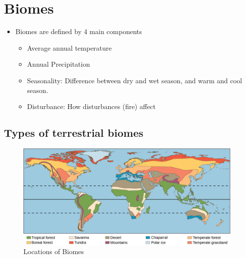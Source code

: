 \documentclass[12pt]{article}
\begin{document}
\section{Biomes}

\begin{itemize}
    \item Biomes are defined by 4 main components
          \begin{itemize}
              \item Average annual temperature
              \item Annual Precipitation
              \item Seasonality: Difference between dry and wet season, and warm and cool season.
              \item Disturbance: How disturbances (fire) affect
          \end{itemize}
\end{itemize}

\subsection{Types of terrestrial biomes}

\begin{figure}
    \centering
    \includegraphics[width=\linewidth]{map.jpg}
    \caption{Locations of Biomes}
\end{figure}
\end{document}
